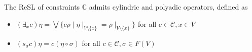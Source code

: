 \documentclass{llncs}
\def\monop{\otimes}
\def\odiv{\, {\ominus\hspace{-7.7pt} \div} \,}
\begin{document}
%
%
%
%


\begin{lemma}
	The ReSL of constraints $\mathbb{C}$ admits cylindric and polyadic operators, defined as
	\begin{itemize}
		\item  $(\exists_x c) \eta = \bigvee \{c \rho \mid \eta\mid_{V \setminus \{x\}} = 
		\rho\mid_{V \setminus \{x\}}\}$ for all $c \in {\mathcal C}, x \in V$
		\item  $(s_\sigma c) \eta = c (\eta \circ \sigma)$ for all $c \in {\mathcal C}, \sigma \in F(V)$	
	\end{itemize}
\end{lemma}
\end{document}

